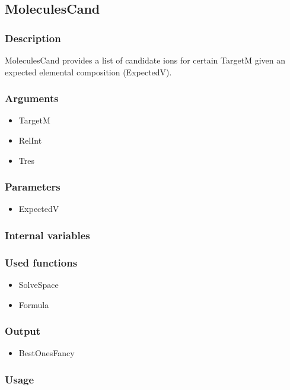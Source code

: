 \subsection{MoleculesCand}
\subsubsection{Description}
MoleculesCand provides a list of candidate ions for certain TargetM given an expected elemental composition (ExpectedV).
\subsubsection{Arguments}
\begin{itemize}
\item TargetM
\item RelInt
\item Tres
\end{itemize}
\subsubsection{Parameters}
\begin{itemize}
\item ExpectedV
\end{itemize}
\subsubsection{Internal variables}
\subsubsection{Used functions}
\begin{itemize}
\item SolveSpace
\item Formula
\end{itemize}
\subsubsection{Output}
\begin{itemize}
\item BestOnesFancy %
\end{itemize}
\subsubsection{Usage}

